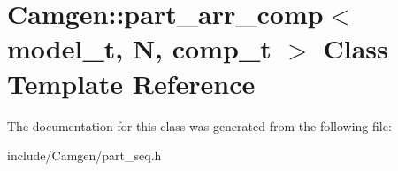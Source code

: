 \hypertarget{a00392}{\section{Camgen\-:\-:part\-\_\-arr\-\_\-comp$<$ model\-\_\-t, N, comp\-\_\-t $>$ Class Template Reference}
\label{a00392}
}


The documentation for this class was generated from the following file\-:\begin{DoxyCompactItemize}
\item 
include/\-Camgen/part\-\_\-seq.\-h\end{DoxyCompactItemize}
